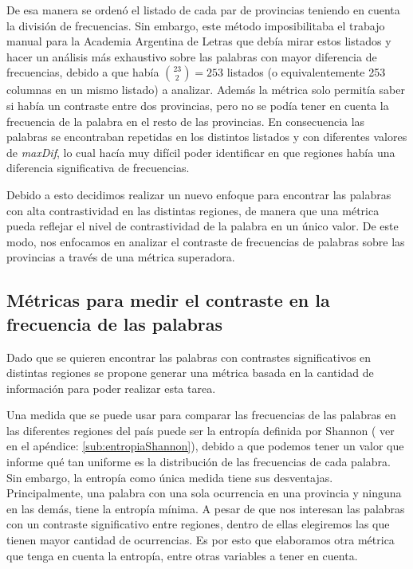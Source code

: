 De esa manera se ordenó el listado de cada par de provincias teniendo en cuenta la división de frecuencias. 
Sin embargo, este método imposibilitaba el trabajo manual para la Academia Argentina de Letras que debía mirar estos listados y hacer un análisis más exhaustivo sobre las palabras con mayor diferencia de frecuencias, debido a que había $\binom{23}{2} = 253$
listados (o equivalentemente 253 columnas en un mismo listado) a analizar. Además la métrica solo permitía saber si había un contraste entre dos provincias, pero no se podía tener en cuenta la frecuencia de la palabra en el resto de las provincias. 
En consecuencia las palabras se encontraban repetidas en los distintos listados y con diferentes valores de \textit{maxDif}, lo cual hacía muy difícil poder identificar en que regiones había una diferencia significativa de frecuencias.

Debido a esto decidimos realizar un nuevo enfoque para encontrar las palabras con alta contrastividad en las distintas regiones, de manera que una métrica pueda reflejar el nivel de contrastividad de la palabra en un único valor.
De este modo, nos enfocamos en analizar el contraste de frecuencias de palabras sobre las provincias a través de una métrica superadora.

\subsection{Métricas para medir el contraste en la frecuencia de las palabras}
Dado que se quieren encontrar las palabras con contrastes significativos en distintas 
regiones se propone generar una métrica basada en la cantidad de información 
para poder realizar esta tarea.

Una medida que se puede usar para comparar las frecuencias de las palabras en las diferentes regiones del país puede ser la entropía definida por Shannon ( ver en el apéndice: \ref{sub:entropiaShannon}), debido a que podemos tener un valor que informe qué tan uniforme es la distribución de las frecuencias de cada palabra.
Sin embargo, la entropía como única medida tiene sus desventajas. Principalmente, una palabra con una sola ocurrencia en una provincia y ninguna en las demás, tiene la entropía mínima. A pesar de que nos interesan las palabras con un contraste significativo entre regiones, dentro de ellas elegiremos las que tienen mayor cantidad de ocurrencias. Es por esto que elaboramos otra métrica que tenga en cuenta la entropía, entre otras variables a tener en cuenta.


